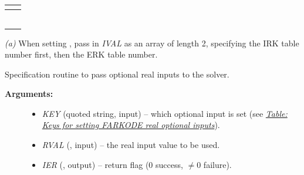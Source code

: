 \documentclass[letterpaper,10pt,english]{sphinxmanual}
\begin{document}
\begin{tabulary}{\linewidth}{|L|L|}
 & 
{\hyperref[c_interface/User_callable:ARKodeSetMaxHnilWarns]{}}
\\\hline

 & 
{\hyperref[c_interface/User_callable:ARKodeSetPredictorMethod]{}}
\\\hline

 & 
{\hyperref[c_interface/User_callable:ARKodeSetMaxErrTestFails]{}}
\\\hline

 & 
{\hyperref[c_interface/User_callable:ARKodeSetMaxConvFails]{}}
\\\hline

 & 
{\hyperref[c_interface/User_callable:ARKodeSetMaxNonlinIters]{}}
\\\hline

 & 
{\hyperref[c_interface/User_callable:ARKodeSetSmallNumEFails]{}}
\\\hline

 & 
{\hyperref[c_interface/User_callable:ARKodeSetMaxStepsBetweenLSet]{}}
\\\hline
\end{tabulary}


\emph{(a)} When setting , pass in \emph{IVAL} as an array of
length 2, specifying the IRK table number first, then the ERK table
number.

\begin{fulllineitems}
\label{f_interface/Usage:f/_/FARKSETRIN}
Specification routine to pass optional real inputs
to the {\hyperref[f_interface/Usage:f/_/FARKODE]{}} solver.
\begin{description}
\item[{\textbf{Arguments:}}] \leavevmode\begin{itemize}
\item {} 
\emph{KEY} (quoted string, input) -- which optional input
is set (see {\hyperref[f_interface/Usage:finterface-rinoptiontable]{\emph{Table: Keys for setting FARKODE real optional inputs}}}).

\item {} 
\emph{RVAL} (, input) -- the real input value to be used.

\item {} 
\emph{IER} (, output) -- return flag (0 success, $\ne 0$ failure).

\end{itemize}

\end{description}

\end{fulllineitems}
\end{document}
